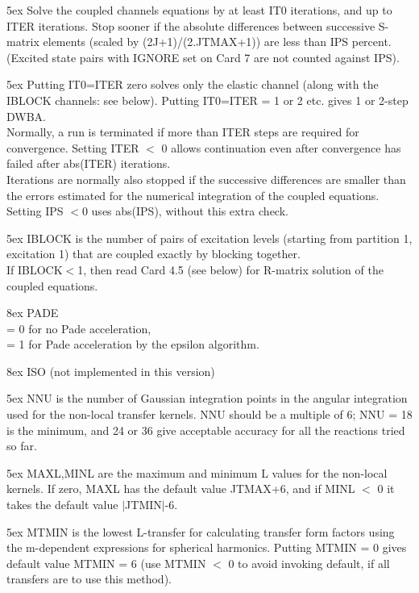 \documentclass[11pt]{article}
\begin{document}
\hangindent 5ex
Solve the coupled channels equations by at least IT0 iterations, and
up to ITER iterations.
Stop sooner if the absolute differences between successive S-matrix
elements (scaled by (2J+1)/(2.JTMAX+1)) are less than IPS percent.
(Excited state pairs with IGNORE set on Card 7
are not counted against IPS).

\hangindent 5ex
Putting IT0=ITER zero solves only the elastic channel (along with the
IBLOCK channels: see below).
Putting IT0=ITER = 1 or 2 etc. gives 1 or 2-step DWBA.
\\
Normally, a run is terminated if more than ITER steps are required for
convergence. Setting ITER $<$ 0 allows continuation even after
convergence has failed after abs(ITER) iterations.
\\
Iterations are normally also stopped if the successive differences are smaller
than the errors estimated for the numerical integration of the coupled
equations. Setting IPS $< 0$ uses abs(IPS), without this extra check.

\hangindent 5ex
IBLOCK is the number of pairs of excitation levels
(starting from partition 1, excitation 1) that are coupled exactly by
blocking together.\\
If IBLOCK$<$1, then read Card 4.5 (see below) for R-matrix solution of the
coupled equations.

\hangindent 8ex
PADE
\\ = 0 for no Pade acceleration,
\\ = 1 for Pade acceleration by the epsilon algorithm.



\hangindent 8ex
ISO (not implemented in this version)

\hangindent 5ex
NNU is the number of Gaussian integration points
in the angular
integration used for the non-local transfer kernels. NNU should
be a multiple of 6; NNU = 18 is the minimum, and 24 or 36 give
acceptable accuracy for all the reactions tried so far.


\hangindent 5ex
MAXL,MINL are the maximum and minimum L values
for the non-local
kernels. If zero, MAXL has the default value JTMAX+6, and
if MINL $<$ 0 it takes the default value $|$JTMIN$|$-6.


\hangindent 5ex
MTMIN is the lowest L-transfer for calculating transfer form factors
using the m-dependent expressions for spherical harmonics.
Putting MTMIN = 0 gives default value MTMIN = 6 (use MTMIN $<$ 0 to avoid
invoking default, if all transfers are to use this method).
\end{document}
